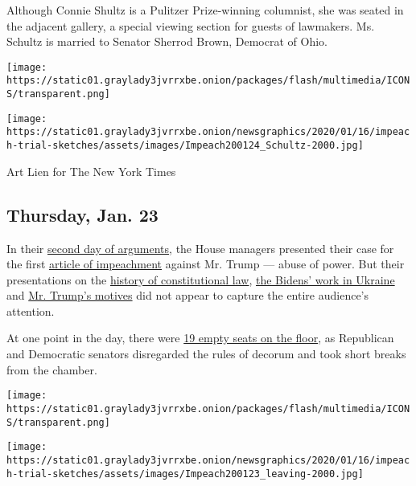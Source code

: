 Although Connie Shultz is a Pulitzer Prize-winning columnist, she was
seated in the adjacent gallery, a special viewing section for guests of
lawmakers. Ms. Schultz is married to Senator Sherrod Brown, Democrat of
Ohio.

\texttt{[image: https://static01.graylady3jvrrxbe.onion/packages/flash/multimedia/ICONS/transparent.png]}

\texttt{[image: https://static01.graylady3jvrrxbe.onion/newsgraphics/2020/01/16/impeach-trial-sketches/assets/images/Impeach200124\_Schultz-2000.jpg]}

Art Lien for The New York Times

\hypertarget{thursday-jan-23}{%
\subsection{Thursday, Jan. 23}\label{thursday-jan-23}}

In their
\href{https://www.nytimes3xbfgragh.onion/2020/01/23/us/politics/trump-impeachment-hearing-today.html}{second
day of arguments}, the House managers presented their case for the first
\href{https://www.nytimes3xbfgragh.onion/interactive/2019/12/10/us/politics/articles-impeachment-document-pdf.html}{article
of impeachment} against Mr. Trump --- abuse of power. But their
presentations on the
\href{https://www.nytimes3xbfgragh.onion/live/2020/impeachment-trial-live-01-23/nadler-gives-a-history-lesson-in-arguing-that-no-crime-is-needed-for-impeachment\#live-blog-list}{history
of constitutional law},
\href{https://www.nytimes3xbfgragh.onion/live/2020/impeachment-trial-live-01-23/democrats-make-a-strategic-decision-in-focusing-on-the-bidens-trumps-lawyer-sees-a-mistake\#live-blog-list}{the
Bidens' work in Ukraine} and
\href{https://www.nytimes3xbfgragh.onion/live/2020/impeachment-trial-live-01-23/house-managers-trump-evidence\#live-blog-list}{Mr.
Trump's motives} did not appear to capture the entire audience's
attention.

At one point in the day, there were
\href{https://www.nytimes3xbfgragh.onion/live/2020/impeachment-trial-live-01-23/republicans-and-democrats-treat-the-rule-to-stay-in-their-seats-rather-liberally\#live-blog-list}{19
empty seats on the floor}, as Republican and Democratic senators
disregarded the rules of decorum and took short breaks from the chamber.

\texttt{[image: https://static01.graylady3jvrrxbe.onion/packages/flash/multimedia/ICONS/transparent.png]}

\texttt{[image: https://static01.graylady3jvrrxbe.onion/newsgraphics/2020/01/16/impeach-trial-sketches/assets/images/Impeach200123\_leaving-2000.jpg]}


